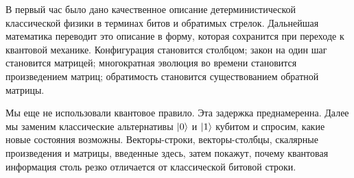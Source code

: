 В первый час было дано качественное описание детерминистической классической физики в терминах битов и обратимых стрелок. Дальнейшая математика переводит это описание в форму, которая сохранится при переходе к квантовой механике. Конфигурация становится столбцом; закон на один шаг становится матрицей; многократная эволюция во времени становится произведением матриц; обратимость становится существованием обратной матрицы.

Мы еще не использовали квантовое правило. Эта задержка преднамеренна. Далее мы заменим классические альтернативы \(\left\lvert0\right\rangle\) и \(\left\lvert1\right\rangle\) кубитом и спросим, какие новые состояния возможны. Векторы-строки, векторы-столбцы, скалярные произведения и матрицы, введенные здесь, затем покажут, почему квантовая информация столь резко отличается от классической битовой строки.

\begin{classroomqa}
\end{classroomqa}